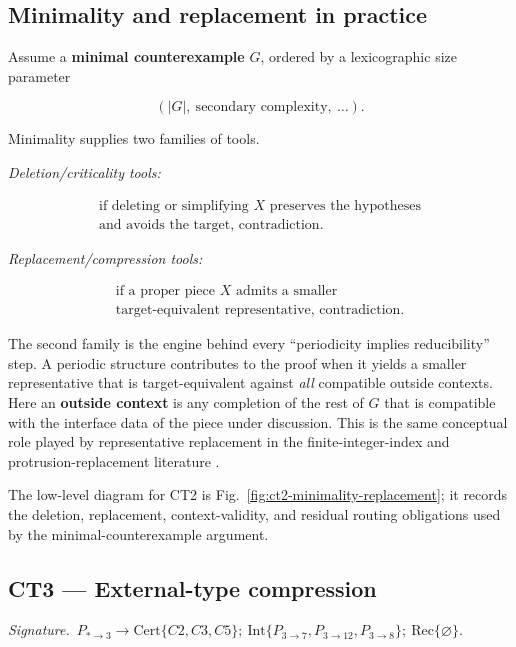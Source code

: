 \documentclass[
  11pt,
]{article}
\theoremstyle{definition}
\newcommand{\ctsignature}[1]{\par\noindent\emph{Signature.}\ #1\par\medskip}
\newcommand{\ctcert}[1]{\mathrm{Cert}\{#1\}}
\newcommand{\ctint}[1]{\mathrm{Int}\{#1\}}
\newcommand{\ctrec}[1]{\mathrm{Rec}\{#1\}}
\newcommand{\ctnone}{\varnothing}
\begin{document}
\subsection*{Minimality and replacement in practice}

Assume a \textbf{minimal counterexample} \(G\), ordered by a
lexicographic size parameter

\[
(|G|,\ \text{secondary complexity},\ \ldots).
\]

Minimality supplies two families of tools.

\emph{Deletion/criticality tools:}

\[
\begin{gathered}
\text{if deleting or simplifying } X \text{ preserves the hypotheses}\\
\text{and avoids the target, contradiction.}
\end{gathered}
\]

\emph{Replacement/compression tools:}

\[
\begin{gathered}
\text{if a proper piece } X \text{ admits a smaller}\\
\text{target-equivalent representative, contradiction.}
\end{gathered}
\]

The second family is the engine behind every ``periodicity implies
reducibility'' step. A periodic structure contributes to the proof when
it yields a smaller representative that is target-equivalent against
\emph{all} compatible outside contexts. Here an \textbf{outside context}
is any completion of the rest of \(G\) that is compatible with the
interface data of the piece under discussion. This is the same
conceptual role played by representative replacement in the
finite-integer-index and protrusion-replacement literature
\citep{bodlaender-etal-2009-meta-kernelization, kim-etal-2012-protrusion, garnero-etal-2013-explicit-kernels, jansen-wulms-2016-lower-bounds}.

The low-level diagram for CT2 is Fig.~\ref{fig:ct2-minimality-replacement};
it records the deletion, replacement, context-validity, and residual
routing obligations used by the minimal-counterexample argument.



\subsection{CT3 --- External-type compression}\label{ct:3}\label{boundaried-pieces-and-external-types}
\ctsignature{\(P_{\ast\to3}\to \ctcert{C2,C3,C5};\ \ctint{P_{3\to7},P_{3\to12},P_{3\to8}};\ \ctrec{\ctnone}\).}
\end{document}
